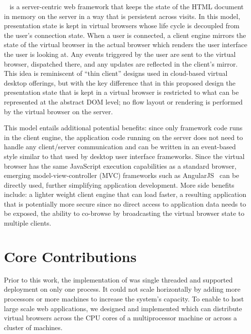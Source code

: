\cb{}~\cite{mcdaniel2012cloudbrowser} is a server-centric web framework 
that keeps the state of the HTML document in memory 
on the server in a way that is persistent across visits.
In this model, presentation state is kept in virtual browsers whose life
cycle is decoupled from the user's connection state.  When a user is connected,
a client engine mirrors the state of the virtual browser in the actual browser which
renders the user interface the user is looking at.  Any events triggered by the
user are sent to the virtual browser, dispatched there, and any updates
are reflected in the client's mirror.  This idea is reminiscent of 
``thin client'' designs used in cloud-based virtual desktop offerings,
but with the key difference that in this proposed design the presentation state
that is kept in a virtual browser is restricted to what can be represented at the
abstract DOM level; no flow layout or rendering is performed by the virtual browser on the 
server.

This model entails additional potential benefits: since only framework code runs in
the client engine, the application code running on the server does not need
to handle any client/server communication and can be written in an event-based
style similar to that used by desktop user interface frameworks.
Since the virtual browser has the same JavaScript execution capabilities as a
standard browser, emerging model-view-controller (MVC) frameworks such as 
AngularJS~\cite{hevery2009angular} can be directly used, further simplifying application development.
More side benefits include: a lighter weight client engine that can load faster,
a resulting application that is potentially more secure since no direct access to
application data needs to be exposed, the ability to co-browse by broadcasting
the virtual browser state to multiple clients.

\section{Core Contributions}

Prior to this work, the implementation of \cb{} was single threaded and
supported deployment on only one process.
It could not scale horizontally by adding more processors or more machines
to increase the system's capacity.
To enable \cb{} to host large scale web applications,
we designed and implemented \cbtwo which can distribute virtual browsers 
across the CPU cores of a multiprocessor machine or across a cluster of machines.

